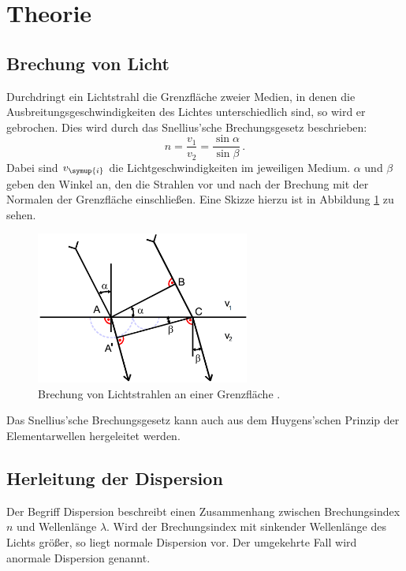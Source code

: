 \section{Theorie}
\label{sec:Theorie}
\subsection{Brechung von Licht}
\label{subsec:brechung}
Durchdringt ein Lichtstrahl die Grenzfläche zweier Medien, in denen die Ausbreitungsgeschwindigkeiten
des Lichtes unterschiedlich sind, so wird er gebrochen. Dies wird durch das Snellius'sche
Brechungsgesetz beschrieben:
\begin{equation}
  n=\frac{v_1}{v_2}=\frac{\sin{\alpha}}{\sin{\beta}} \,.
  \label{eqn:snelluis}
\end{equation}
Dabei sind $v_{\symup{i}}$ die Lichtgeschwindigkeiten im jeweiligen Medium. $\alpha$
und $\beta$ geben den Winkel an, den die Strahlen vor und nach der Brechung mit der
Normalen der Grenzfläche einschließen. Eine Skizze hierzu ist in Abbildung \ref{fig:brechung}
zu sehen.

\begin{figure}[H]
  \centering
  \includegraphics[height=5cm]{data/brechung.png}
  \caption{Brechung von Lichtstrahlen an einer Grenzfläche \cite{Versuchsanleitung}.}
  \label{fig:brechung}
\end{figure}

Das Snellius'sche Brechungsgesetz kann auch aus dem Huygens'schen Prinzip der Elementarwellen
hergeleitet werden.

\subsection{Herleitung der Dispersion}
\label{subsec:dispersion1}
Der Begriff Dispersion beschreibt einen Zusammenhang zwischen Brechungsindex $n$ und
Wellenlänge $\lambda$. Wird der Brechungsindex mit sinkender Wellenlänge des Lichts
größer, so liegt normale Dispersion vor. Der umgekehrte Fall wird anormale Dispersion
genannt.


